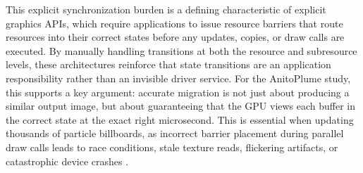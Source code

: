 This explicit synchronization burden is a defining characteristic of explicit graphics APIs, which require applications to issue resource barriers that route resources into their correct states before any updates, copies, or draw calls are executed. By manually handling transitions at both the resource and subresource levels, these architectures reinforce that state transitions are an application responsibility rather than an invisible driver service. For the AnitoPlume study, this supports a key argument: accurate migration is not just about producing a similar output image, but about guaranteeing that the GPU views each buffer in the correct state at the exact right microsecond. This is essential when updating thousands of particle billboards, as incorrect barrier placement during parallel draw calls leads to race conditions, stale texture reads, flickering artifacts, or catastrophic device crashes \cite{cheung2024applications}.


